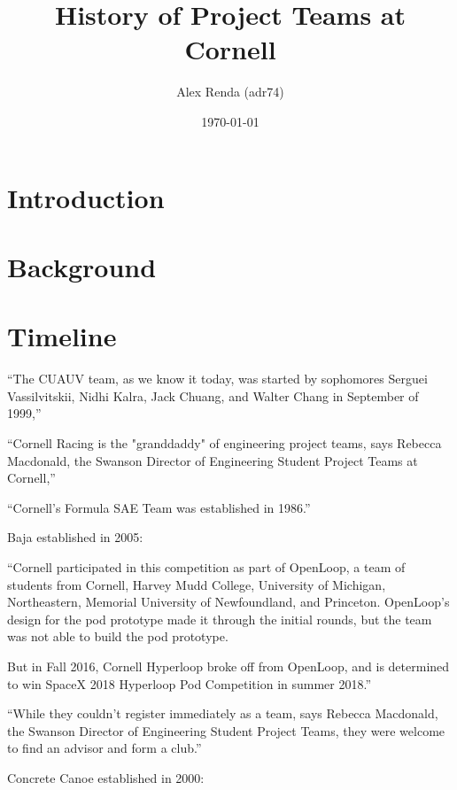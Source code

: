 \documentclass[12pt]{article}
\title{History of Project Teams at Cornell}
\author{Alex Renda (adr74)}
\date{\monthyeardate\today}
\begin{document}
\maketitle

\section{Introduction}

\section{Background}

\section{Timeline}

\begin{landscape}

\end{landscape}

``The CUAUV team, as we know it today, was started by sophomores Serguei Vassilvitskii, Nidhi Kalra, Jack Chuang, and Walter Chang in September of 1999,''
\cite{noauthor_cuauv_2003}

``Cornell Racing is the "granddaddy" of engineering project teams, says Rebecca Macdonald, the Swanson Director of Engineering Student Project Teams at Cornell,''
\cite{klein_engineering_2015}

``Cornell’s Formula SAE Team was established in 1986.''
\cite{noauthor_cornell_2012}

Baja established in 2005:
\cite{noauthor_history_2017}

``Cornell participated in this competition as part of OpenLoop, a team of students from Cornell, Harvey Mudd College, University of Michigan, Northeastern, Memorial University of Newfoundland, and Princeton.  OpenLoop’s design for the pod prototype made it through the initial rounds, but the team was not able to build the pod prototype.

But in Fall 2016, Cornell Hyperloop broke off from OpenLoop, and is determined to win SpaceX 2018 Hyperloop Pod Competition in summer 2018.''
\cite{roseman_how_2017}

``While they couldn’t register immediately as a team, says Rebecca Macdonald, the Swanson Director of Engineering Student Project Teams, they were welcome to find an advisor and form a club.''
\cite{giller_openloop:_2016}


Concrete Canoe established in 2000:
\cite{noauthor_cornell_2017}
\end{document}

